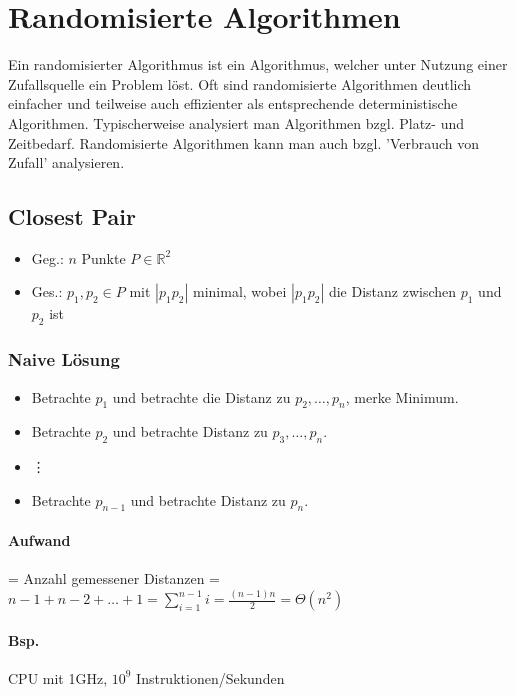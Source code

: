 \section{Randomisierte Algorithmen}
Ein randomisierter Algorithmus ist ein Algorithmus, welcher unter Nutzung einer Zufallsquelle ein Problem löst. Oft sind randomisierte Algorithmen deutlich einfacher und teilweise auch effizienter als entsprechende deterministische Algorithmen. Typischerweise analysiert man Algorithmen bzgl. Platz- und Zeitbedarf. Randomisierte Algorithmen kann man auch bzgl. 'Verbrauch von Zufall' analysieren.


\subsection{Closest Pair}
\begin{itemize}
	\item[] Geg.: $n$ Punkte $P \in \mathbb{R}^2$
	\item[]Ges.: $p_1,p_2 \in P$ mit $|p_1 p_2|$ minimal, wobei $|p_1 p_2|$ die Distanz zwischen $p_1$ und $p_2$ ist
\end{itemize}


\subsubsection{Naive Lösung}
\begin{itemize}
	\item[] Betrachte $p_1$ und betrachte die Distanz zu $p_2,\dots,p_n$, merke Minimum.
	\item[] Betrachte $p_2$ und betrachte Distanz zu $p_3,\dots,p_n$.
	\item[] \hspace{1cm}\vdots
	\item[] Betrachte $p_{n-1}$ und betrachte Distanz zu $p_n$.
\end{itemize}


\paragraph*{Aufwand} = Anzahl gemessener Distanzen = $n-1 + n-2 + \dots + 1 = \sum\limits_{i=1}^{n-1} i = \frac{(n-1)n}{2} = \Theta(n^2)$
 

\paragraph*{Bsp.} CPU mit 1GHz, $10^9$ Instruktionen/Sekunden

